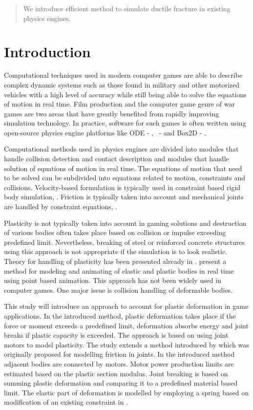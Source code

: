 \begin{abstract}
We introduce efficient method to simulate ductile fracture in existing physics engines.
\end{abstract}

\section{Introduction}

Computational techniques used in modern computer games are able to describe
complex dynamic systems such as those found in military and other motorized vehicles
with a high level of accuracy while still being able to solve the equations of motion in real time.
Film production and the computer game genre of war games
are two areas that have greatly benefited from rapidly improving simulation technology. 
In practice, software for such games is often written using open-source physics engine platforms  
like ODE - \cite{ode}, \bullet\ - \cite{bullet} and Box2D - \cite{box2d}.

Computational methods used in physics engines are divided into modules that handle collision detection and 
contact description and modules that handle solution of equations of motion in real time. 
The equations of motion that need to be 
solved can be subdivided into equations related to motion, constraints and collisions. 
Velocity-based formulation is typically used in constraint based rigid body simulation, \cite{erleben.thesis}. 
Friction is typically taken into account and mechanical joints are handled by constraint equations,
\cite{erleben.thesis}.

Plasticity is not typically taken into account in gaming solutions and 
destruction of various bodies often takes place based on collision or impulse exceeding predefined limit.
Nevertheless, breaking of steel or reinforced concrete structures using this approach 
is not appropriate if the simulation is to look realistic. Theory for handling of plasticity 
has been presented already in \cite{cg1988}. \cite{muller2005meshless} 
present a method for modeling and animating of elastic and plastic bodies in real time using 
point based animation. This approach has not been widely used in computer games.  
One major issue is collision handling of deformable bodies.

This study will introduce an approach to account for plastic deformation in game applications.   
In the introduced method, plastic deformation takes place if the force or moment exceeds a predefined 
limit, deformation absorbs energy and joint breaks if plastic capacity is exceeded. 
The approach is based on using joint motors to model plasticity. 
The study extends a method introduced by
\cite{erleben.thesis} 
which was originally proposed for modelling friction in joints. 
In the introduced method adjacent bodies are connected by motors. 
Motor power production limits are estimated based on the plastic section modulus. 
Joint breaking is based on summing plastic deformation and comparing it to a
predefined material based limit. The elastic part of deformation is modelled by employing 
a spring based on modification of an existing constraint in \bullet.

